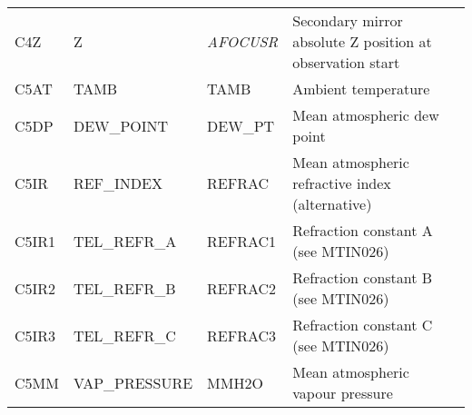 \begin{sidewaystable*}
\begin{center}
\begin{tabular}{llll}
C4Z & Z & \emph{AFOCUSR} & Secondary mirror absolute Z position at observation start\\
C5AT & TAMB & TAMB & Ambient temperature\\
C5DP & DEW\_POINT & DEW\_PT & Mean atmospheric dew point\\
C5IR & REF\_INDEX & REFRAC & Mean atmospheric refractive index (alternative)\\
C5IR1 & TEL\_REFR\_A & REFRAC1 & Refraction constant A (see MTIN026)\\
C5IR2 & TEL\_REFR\_B & REFRAC2 & Refraction constant B (see MTIN026)\\
C5IR3 & TEL\_REFR\_C & REFRAC3 & Refraction constant C (see MTIN026)\\
C5MM & VAP\_PRESSURE & MMH2O & Mean atmospheric vapour pressure\\

\hline
\end{tabular}
\end{center}
\end{sidewaystable*}


